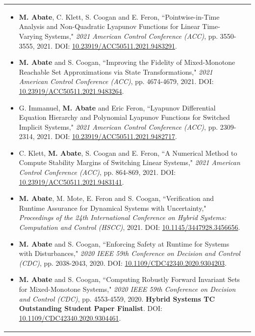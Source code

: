 \documentclass{article}
\begin{document}
\newpage

\begin{tabular}{ m{6.9in} m{0in}}
\begin{itemize}
    \item[{[C11]}] \textbf{M. Abate}, C. Klett, S. Coogan and E. Feron, ``Pointwise-in-Time Analysis and Non-Quadratic Lyapunov Functions for Linear Time-Varying Systems," \emph{2021 American Control Conference (ACC)}, pp. 3550-3555, 2021. DOI: \href{https://ieeexplore.ieee.org/document/9483291}{10.23919/ACC50511.2021.9483291}.
    \item[{[C10]}] \textbf{M. Abate} and S. Coogan, ``Improving the Fidelity of Mixed-Monotone Reachable Set Approximations via State Transformations," \emph{2021 American Control Conference (ACC)}, pp. 4674-4679, 2021. DOI: \href{https://ieeexplore.ieee.org/document/9483264}{10.23919/ACC50511.2021.9483264}.
%
\item[{[C9]}] G. Immanuel, \textbf{M. Abate} and Eric Feron, ``Lyapunov Differential Equation Hierarchy and Polynomial Lyapunov Functions for Switched Implicit Systems," \emph{2021 American Control Conference (ACC)}, pp. 2309-2314, 2021. DOI: \href{https://ieeexplore.ieee.org/document/9482717}{10.23919/ACC50511.2021.9482717}.
%
\item[{[C8]}] C. Klett, \textbf{M. Abate}, S. Coogan and E. Feron, ``A Numerical Method to Compute Stability Margins of Switching Linear Systems," \emph{2021 American Control Conference (ACC)}, pp. 864-869, 2021. DOI: \href{https://ieeexplore.ieee.org/document/9483141}{10.23919/ACC50511.2021.9483141}.
%
\item[{[C7]}] \textbf{M. Abate}, M. Mote, E. Feron and S. Coogan, ``Verification and Runtime Assurance for Dynamical Systems with Uncertainty," \emph{Proceedings of the 24th International Conference on Hybrid Systems: Computation and Control (HSCC)}, 2021. 
 DOI: \href{https://doi.org/10.1145/3447928.3456656}{10.1145/3447928.3456656}.
%
\item[{[C6]}] \textbf{M. Abate} and S. Coogan, ``Enforcing Safety at Runtime for Systems with Disturbances," \emph{2020 IEEE 59th Conference on Decision and Control (CDC)}, pp. 2038-2043, 2020. DOI: \href{https://ieeexplore.ieee.org/document/9304203}{10.1109/CDC42340.2020.9304203}.
%
\item[{[C5]}] \textbf{M. Abate} and S. Coogan, ``Computing Robustly Forward Invariant Sets for Mixed-Monotone Systems," \emph{2020 IEEE 59th Conference on Decision and Control (CDC)}, pp. 4553-4559, 2020. \textbf{Hybrid Systems TC Outstanding Student Paper Finalist}. DOI: \href{https://ieeexplore.ieee.org/document/9304461}{10.1109/CDC42340.2020.9304461}.

\end{itemize}
\end{tabular}
\end{document}
